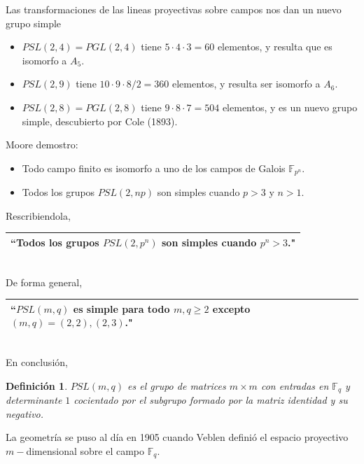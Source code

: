 \documentclass{article}
\numberwithin{equation}{section}
\theoremstyle{plain}  %
\newtheorem{Def}{Definición}[section]
\begin{document}
Las transformaciones de las lineas proyectivas sobre campos nos dan un nuevo grupo simple

\begin{itemize}
    \item<1-> $PSL(2, 4) = PGL(2, 4)$ tiene $5\cdot 4\cdot 3 = 60$ elementos, y resulta que es isomorfo a $A_5$.\newline
    
    \item<2-> $PSL(2, 9)$ tiene $10 \cdot 9 \cdot 8/2 = 360$ elementos, y resulta ser isomorfo a $A_6$.\newline
    
    \item<3-> $PSL(2, 8) = PGL(2, 8)$ tiene $9 \cdot 8 \cdot 7 = 504$ elementos, y es un nuevo grupo simple, descubierto por Cole (1893).
    
\end{itemize} 
Moore demostro:

\begin{itemize}
    \item Todo campo finito es isomorfo a uno de los campos de Galois $\mathbb{F}_{p^n}$.\newline
    
    \item Todos los grupos $PSL(2,np)$ son simples cuando $p>3$ y $n>1$.\newline
\end{itemize}
Rescribiendola,
\\
\begin{tabular}{|l|}
    \hline
    ``Todos los grupos $PSL(2,p^n)$ son simples cuando $p^n>3$." \\ \hline
\end{tabular}
\\
De forma general,
\\
\begin{tabular}{|l|}
    \hline
    ``$PSL(m,q)$ es simple para todo $m,q\geq 2$ excepto $(m,q) = (2,2), (2,3)$." \\ \hline
\end{tabular}
\\ 
En conclusión, 
\begin{Def}
    $PSL(m,q)$ es el grupo de matrices $m\times m$ con entradas en $\mathbb{F}_q$ y 
    determinante $1$ cocientado por el subgrupo formado por la matriz identidad y su negativo.
\end{Def}
La geometría se puso al día en 1905 cuando Veblen definió el espacio proyectivo $m-$dimensional sobre el campo $\mathbb{F}_q$.\newline
\end{document}
